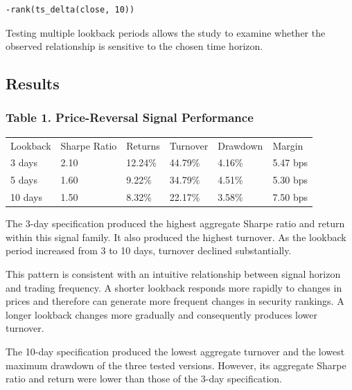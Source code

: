\documentclass{article}
\begin{document}
\begin{verbatim}
-rank(ts_delta(close, 10))
\end{verbatim}

Testing multiple lookback periods allows the study to examine whether the observed relationship is sensitive to the chosen time horizon.

 

\subsection{ Results}

\subsubsection{Table 1. Price-Reversal Signal Performance}

\begin{table}
\centering

\begin{tabular}{l l l l l l}
Lookback & Sharpe Ratio & Returns & Turnover & Drawdown & Margin \\

3 days & 2.10 & 12.24\% & 44.79\% & 4.16\% & 5.47 bps \\
5 days & 1.60 & 9.22\% & 34.79\% & 4.51\% & 5.30 bps \\
10 days & 1.50 & 8.32\% & 22.17\% & 3.58\% & 7.50 bps \\

\end{tabular}

\end{table}

The 3-day specification produced the highest aggregate Sharpe ratio and return within this signal family. It also produced the highest turnover. As the lookback period increased from 3 to 10 days, turnover declined substantially.

This pattern is consistent with an intuitive relationship between signal horizon and trading frequency. A shorter lookback responds more rapidly to changes in prices and therefore can generate more frequent changes in security rankings. A longer lookback changes more gradually and consequently produces lower turnover.

The 10-day specification produced the lowest aggregate turnover and the lowest maximum drawdown of the three tested versions. However, its aggregate Sharpe ratio and return were lower than those of the 3-day specification.
\end{document}

